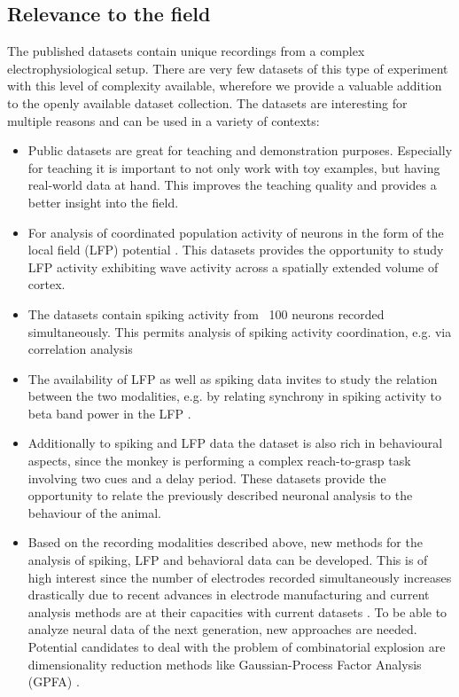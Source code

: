 \subsection{Relevance to the field}
The published datasets contain unique recordings from a complex electrophysiological setup. There are very few datasets of this type of experiment with this level of complexity available, wherefore we provide a valuable addition to the openly available dataset collection. The datasets are interesting for multiple reasons and can be used in a variety of contexts:
\begin{itemize}
 \item Public datasets are great for teaching and demonstration purposes. Especially for teaching it is important to not only work with toy examples, but having real-world data at hand. This improves the teaching quality and provides a better insight into the field.
 \item For analysis of coordinated population activity of neurons in the form of the local field (LFP) potential \citep{Mitzdorf_1985, Logothetis_2004, Einevoll_2013}. This datasets provides the opportunity to study LFP activity exhibiting wave activity across a spatially extended volume of cortex\citep{Denker_2018}.
 \item The datasets contain spiking activity from ~100 neurons recorded simultaneously. This permits analysis of spiking activity coordination, e.g. via correlation analysis \citep{Torre_2016, Torre_2016a, Quaglio_2017, Quaglio_2018}
 \item The availability of LFP as well as spiking data invites to study the relation between the two modalities, e.g. by relating synchrony in spiking activity to beta band power in the LFP \citep{Denker_2011}.
 \item Additionally to spiking and LFP data the dataset is also rich in behavioural aspects, since the monkey is performing a complex reach-to-grasp task involving two cues and a delay period. These datasets provide the opportunity to relate the previously described neuronal analysis to the behaviour of the animal.
 \item Based on the recording modalities described above, new methods for the analysis of spiking, LFP and behavioral data can be developed. This is of high interest since the number of electrodes recorded simultaneously increases drastically due to recent advances in electrode manufacturing and current analysis methods are at their capacities with current datasets \citep{Seo_2015,Jun_2017}. To be able to analyze neural data of the next generation, new approaches are needed. Potential candidates to deal with the problem of combinatorial explosion are dimensionality reduction methods like Gaussian-Process Factor Analysis (GPFA) \citep{Yu_2009}. 

\end{itemize}
